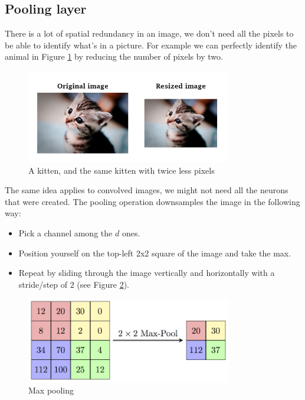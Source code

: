 \newpage
\subsection{Pooling layer}

There is a lot of spatial redundancy in an image, we don't need all the pixels to be able to identify what's in a picture. For example we can perfectly identify the animal in Figure \ref{kittens} by reducing the number of pixels by two.

\begin{figure}[H]
\centering
\includegraphics[width=0.8\textwidth]{Images/kittens.png}
\caption{A kitten, and the same kitten with twice less pixels}
\label{kittens}
\end{figure}

The same idea applies to convolved images, we might not need all the neurons that were created. The pooling operation downsamples the image in the following way:
\begin{itemize}
\item Pick a channel among the $d$ ones.
\item Position yourself on the top-left 2x2 square of the image and take the max.
\item Repeat by sliding through the image vertically and horizontally with a stride/step of 2 (see Figure \ref{maxpool}).
\end{itemize}

\begin{figure}[H]
\centering
\includegraphics[width=0.8\textwidth]{Images/maxpool.png}
\caption{Max pooling \cite{camb-spark}}
\label{maxpool}
\end{figure}

